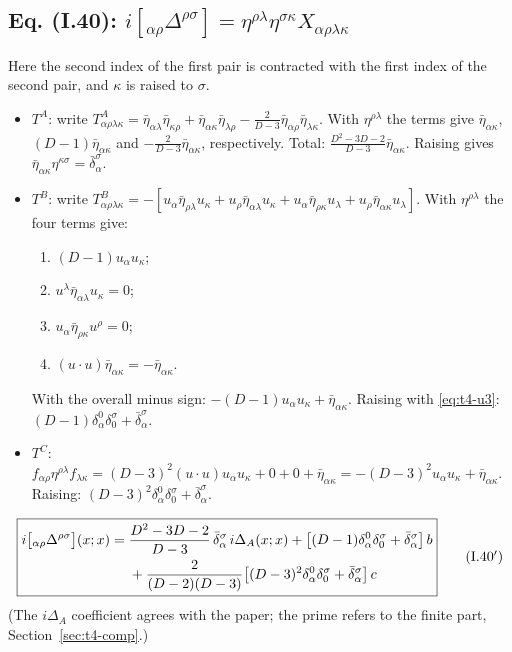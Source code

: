 \subsection{Eq. (I.40): \texorpdfstring{$i[{}_{\alpha\rho}\Delta^{\rho\sigma}]=\eta^{\rho\lambda}\eta^{\sigma\kappa}X_{\alpha\rho\lambda\kappa}$}{the mixed contraction} \texorpdfstring{\tD}{}}
Here the second index of the first pair is contracted with the first index of the second
pair, and \(\kappa\) is raised to \(\sigma\).
\begin{itemize}
\item \(T^A\): write
\(T^A_{\alpha\rho\lambda\kappa}=\bar\eta_{\alpha\lambda}\bar\eta_{\kappa\rho}+\bar\eta_{\alpha\kappa}\bar\eta_{\lambda\rho}-\tfrac2{D-3}\bar\eta_{\alpha\rho}\bar\eta_{\lambda\kappa}\).
With \(\eta^{\rho\lambda}\) the terms give \(\bar\eta_{\alpha\kappa}\), \((D-1)\bar\eta_{\alpha\kappa}\) and
\(-\tfrac{2}{D-3}\bar\eta_{\alpha\kappa}\), respectively. Total:
\(\tfrac{D^2-3D-2}{D-3}\bar\eta_{\alpha\kappa}\). Raising gives
\(\bar\eta_{\alpha\kappa}\eta^{\kappa\sigma}=\bar\delta^\sigma_\alpha\).
\item \(T^B\): write
\(T^B_{\alpha\rho\lambda\kappa}=-[u_\alpha\bar\eta_{\rho\lambda}u_\kappa+u_\rho\bar\eta_{\alpha\lambda}u_\kappa+u_\alpha\bar\eta_{\rho\kappa}u_\lambda+u_\rho\bar\eta_{\alpha\kappa}u_\lambda]\).
With \(\eta^{\rho\lambda}\) the four terms give:
\begin{enumerate}[nosep]
\item \((D-1)u_\alpha u_\kappa\);
\item \(u^\lambda\bar\eta_{\alpha\lambda}u_\kappa=0\);
\item \(u_\alpha\bar\eta_{\rho\kappa}u^\rho=0\);
\item \((u\cdot u)\bar\eta_{\alpha\kappa}=-\bar\eta_{\alpha\kappa}\).
\end{enumerate}
With the overall minus sign: \(-(D-1)u_\alpha u_\kappa+\bar\eta_{\alpha\kappa}\). Raising with
\eqref{eq:t4-u3}: \((D-1)\delta^0_\alpha\delta^\sigma_0+\bar\delta^\sigma_\alpha\).
\item \(T^C\): \(f_{\alpha\rho}\eta^{\rho\lambda}f_{\lambda\kappa}=(D-3)^2(u\cdot u)u_\alpha u_\kappa+0+0+\bar\eta_{\alpha\kappa}
=-(D-3)^2u_\alpha u_\kappa+\bar\eta_{\alpha\kappa}\). Raising:
\((D-3)^2\delta^0_\alpha\delta^\sigma_0+\bar\delta^\sigma_\alpha\).
\end{itemize}
\begin{equation*}\label{eq:t4-I40}
\boxed{\begin{aligned}i\bigl[{}_{\alpha\rho}\Delta^{\rho\sigma}\bigr](x;x)={}&\frac{D^2-3D-2}{D-3}\,\bar\delta^\sigma_\alpha\,i\Delta_A(x;x)+\bigl[(D-1)\delta^0_\alpha\delta^\sigma_0+\bar\delta^\sigma_\alpha\bigr]\,b\\
&+\frac{2}{(D-2)(D-3)}\bigl[(D-3)^2\delta^0_\alpha\delta^\sigma_0+\bar\delta^\sigma_\alpha\bigr]\,c\end{aligned}}
\tag{I.40$'$}
\end{equation*}
(The \(i\Delta_A\) coefficient agrees with the paper; the prime refers to the finite part,
Section~\ref{sec:t4-comp}.)


